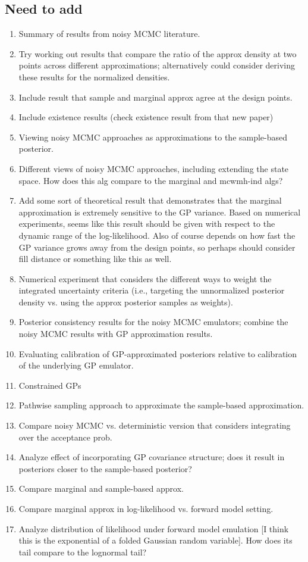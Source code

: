 \documentclass[12pt]{article}
\begin{document}
\subsection{Need to add}
\begin{enumerate}
\item Summary of results from noisy MCMC literature.
\item Try working out results that compare the ratio of the approx density at two points across different approximations; 
alternatively could consider deriving these results for the normalized densities. 
\item Include result that sample and marginal approx agree at the design points.
\item Include existence results (check existence result from that new paper)
\item Viewing noisy MCMC approaches as approximations to the sample-based posterior.
\item Different views of noisy MCMC approaches, including extending the state space. How does this alg compare to the 
marginal and mcwmh-ind algs?
\item Add some sort of theoretical result that demonstrates that the marginal approximation is extremely sensitive to the GP 
variance. Based on numerical experiments, seems like this result should be given with respect to the dynamic range of the 
log-likelihood. Also of course depends on how fast the GP variance grows away from the design points, so perhaps should 
consider fill distance or something like this as well.
\item Numerical experiment that considers the different ways to weight the integrated uncertainty criteria (i.e., targeting 
the unnormalized posterior density vs. using the approx posterior samples as weights).
\item Posterior consistency results for the noisy MCMC emulators; combine the noisy MCMC results with GP approximation 
results.
\item Evaluating calibration of GP-approximated posteriors relative to calibration of the underlying GP emulator.
\item Constrained GPs
\item Pathwise sampling approach to approximate the sample-based approximation.
\item Compare noisy MCMC vs. deterministic version that considers integrating over the acceptance prob. 
\item Analyze effect of incorporating GP covariance structure; does it result in posteriors closer to the sample-based posterior? 
\item Compare marginal and sample-based approx.
\item Compare marginal approx in log-likelihood vs. forward model setting. 
\item Analyze distribution of likelihood under forward model emulation [I think this is the exponential of a folded Gaussian random variable]. 
How does its tail compare to the lognormal tail? 
\end{enumerate}
\end{document}
